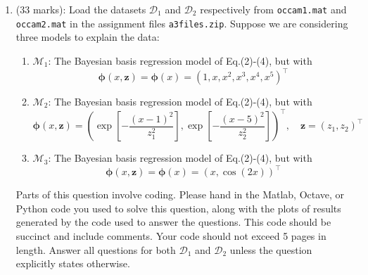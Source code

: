 \documentclass[11pt]{article}
\newcommand{\mbf}[1]{{\boldsymbol{\mathbf{#1}}}}
\renewcommand{\bm}{\mbf}
\begin{document}
\begin{enumerate}
\item (33 marks): Load the datasets $\mathcal{D}_1$ and $\mathcal{D}_2$ respectively from \texttt{occam1.mat} and \texttt{occam2.mat} in the assignment files \texttt{a3files.zip}.  Suppose we are considering three models to explain the data:
\begin{enumerate}[label=(\roman*)]
\item $\mathcal{M}_1$: The Bayesian basis regression model of Eq.(2)-(4), but with 
\begin{equation}
\bm{\phi}(x,\bm{z}) = \bm{\phi}(x) = (1,x,x^2,x^3,x^4,x^5)^{\top}
\end{equation}
\item $\mathcal{M}_2$: The Bayesian basis regression model of Eq.(2)-(4), but with 
\begin{equation}
\bm{\phi}(x,\bm{z}) =  \left( \exp[-\frac{(x-1)^2}{z_1^2}], \exp[-\frac{(x-5)^2}{z_2^2}] \right)^{\top}, \quad \bm{z} = (z_1,z_2)^{\top}
\end{equation}
\item $\mathcal{M}_3$: The Bayesian basis regression model of Eq.(2)-(4), but with 
\begin{equation}
\bm{\phi}(x,\bm{z}) =  \bm{\phi}(x) = (x,\cos(2x))^{\top}
\end{equation}
\end{enumerate}
Parts of this question involve coding.  Please hand in the Matlab, Octave, or Python code you used to solve this question, along with the plots of results generated by the code used to answer the questions.  This code should be succinct and include comments.  Your code should not exceed 5 pages in length.   Answer all questions for both $\mathcal{D}_1$ and $\mathcal{D}_2$ unless the question explicitly states otherwise.


\end{enumerate}
\end{document}
